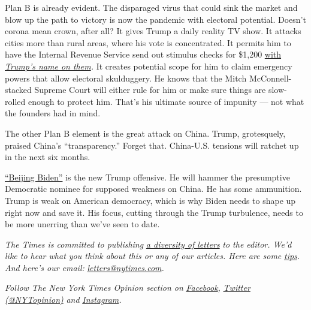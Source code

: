 Plan B is already evident. The disparaged virus that could sink the
market and blow up the path to victory is now the pandemic with
electoral potential. Doesn't corona mean crown, after all? It gives
Trump a daily reality TV show. It attacks cities more than rural areas,
where his vote is concentrated. It permits him to have the Internal
Revenue Service send out stimulus checks for \$1,200
\href{https://www.washingtonpost.com/politics/coming-to-your-1200-relief-check-donald-j-trumps-name/2020/04/14/071016c2-7e82-11ea-8013-1b6da0e4a2b7_story.html}{with}
\href{https://www.washingtonpost.com/politics/coming-to-your-1200-relief-check-donald-j-trumps-name/2020/04/14/071016c2-7e82-11ea-8013-1b6da0e4a2b7_story.html}{\emph{Trump's
name on them}}\emph{.} It creates potential scope for him to claim
emergency powers that allow electoral skulduggery. He knows that the
Mitch McConnell-stacked Supreme Court will either rule for him or make
sure things are slow-rolled enough to protect him. That's his ultimate
source of impunity --- not what the founders had in mind.

The other Plan B element is the great attack on China. Trump,
grotesquely, praised China's ``transparency.'' Forget that. China-U.S.
tensions will ratchet up in the next six months.

\href{https://www.axios.com/biggest-trump-super-pac-test-drives-beijingbiden-campaign-75582a64-6edc-48ec-9b38-f307816b6a32.html}{``Beijing
Biden''} is the new Trump offensive. He will hammer the presumptive
Democratic nominee for supposed weakness on China. He has some
ammunition. Trump is weak on American democracy, which is why Biden
needs to shape up right now and save it. His focus, cutting through the
Trump turbulence, needs to be more unerring than we've seen to date.

\emph{The Times is committed to publishing}
\href{https://www.nytimes.com/2019/01/31/opinion/letters/letters-to-editor-new-york-times-women.html}{\emph{a
diversity of letters}} \emph{to the editor. We'd like to hear what you
think about this or any of our articles. Here are some}
\href{https://help.nytimes.com/hc/en-us/articles/115014925288-How-to-submit-a-letter-to-the-editor}{\emph{tips}}\emph{.
And here's our email:}
\href{mailto:letters@nytimes.com}{\emph{letters@nytimes.com}}\emph{.}

\emph{Follow The New York Times Opinion section on}
\href{https://www.facebook.com/nytopinion}{\emph{Facebook}}\emph{,}
\href{http://twitter.com/NYTOpinion}{\emph{Twitter (@NYTopinion)}}
\emph{and}
\href{https://www.instagram.com/nytopinion/}{\emph{Instagram}}\emph{.}

